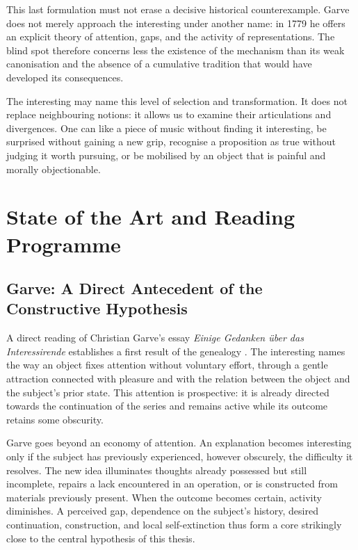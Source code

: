 \documentclass[11pt,a4paper]{article}
\begin{document}
This last formulation must not erase a decisive historical counterexample.
Garve does not merely approach the interesting under another name: in 1779 he
offers an explicit theory of attention, gaps, and the activity of
representations. The blind spot therefore concerns less the existence of the
mechanism than its weak canonisation and the absence of a cumulative tradition
that would have developed its consequences.

The interesting may name this level of selection and transformation. It does
not replace neighbouring notions: it allows us to examine their articulations
and divergences. One can like a piece of music without finding it interesting,
be surprised without gaining a new grip, recognise a proposition as true
without judging it worth pursuing, or be mobilised by an object that is painful
and morally objectionable.

\section{State of the Art and Reading Programme}

\subsection{Garve: A Direct Antecedent of the Constructive Hypothesis}

A direct reading of Christian Garve's essay \emph{Einige Gedanken über das
Interessirende} establishes a first result of the genealogy
\parencite[253--274, 313--317]{garve1779interessirende}. The interesting names
the way an object fixes attention without voluntary effort, through a gentle
attraction connected with pleasure and with the relation between the object and
the subject's prior state. This attention is prospective: it is already
directed towards the continuation of the series and remains active while its
outcome retains some obscurity.

Garve goes beyond an economy of attention. An explanation becomes interesting
only if the subject has previously experienced, however obscurely, the
difficulty it resolves. The new idea illuminates thoughts already possessed but
still incomplete, repairs a lack encountered in an operation, or is constructed
from materials previously present. When the outcome becomes certain, activity
diminishes. A perceived gap, dependence on the subject's history, desired
continuation, construction, and local self-extinction thus form a core strikingly
close to the central hypothesis of this thesis.
\end{document}
